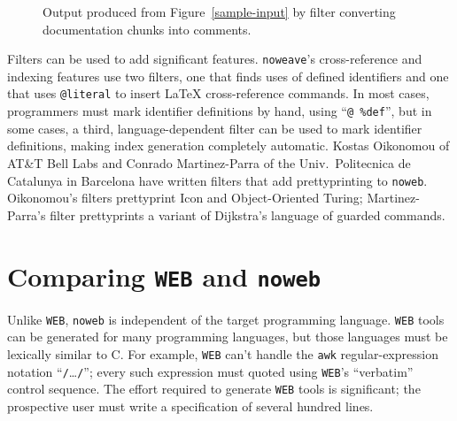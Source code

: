 \begin{figure}[p]
\caption{Output produced from 
Figure~\protect\ref{sample-input} by filter converting documentation
chunks into comments.}
\label{nountangle-output}
\end{figure}



Filters can be used to add significant features.
\verb+noweave+'s cross-reference and indexing features use two
filters, one that finds uses of defined identifiers and one that 
uses \verb+@literal+ to insert {\LaTeX} cross-reference
commands.
In most cases, programmers must mark identifier definitions
by hand, using ``{\tt @~\%def}'', 
but
in some cases, a third, language-dependent filter can be used to
mark identifier definitions,
making index generation completely automatic.
Kostas Oikonomou of AT\&T Bell Labs and Conrado Martinez-Parra of 
the Univ.\ Politecnica de Catalunya in Barcelona have written filters
that add prettyprinting to {\tt noweb}.
Oikonomou's filters prettyprint Icon and Object-Oriented Turing;
Martinez-Parra's filter prettyprints a variant of Dijkstra's language
of guarded commands.


\section{Comparing {\tt WEB} and {\tt noweb}}

Unlike {\tt WEB},
\verb+noweb+ is independent of the target programming language.
{\tt WEB} tools can be generated for many programming languages, 
but those languages must be lexically similar to C.
For example, {\tt WEB} can't handle the \verb+awk+ regular-expression
notation ``\verb+/+\ldots\verb+/+''; every such expression must quoted
using {\tt WEB}'s ``verbatim'' control sequence.
The effort required to 
generate {\tt WEB} tools is significant; the prospective user must
write a specification of several hundred 
lines.

